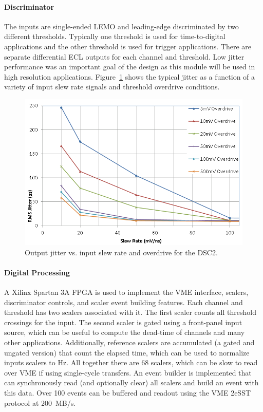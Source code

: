 \paragraph{Discriminator}
The inputs are single-ended LEMO and leading-edge discriminated by two different thresholds. Typically one threshold
is used for time-to-digital applications and the other threshold is used for trigger applications. There are separate
differential ECL outputs for each channel and threshold. Low jitter performance was an important goal of the design as
this module will be used in high resolution applications. Figure~\ref{fig:dsc2_jitter} shows the typical jitter as a function
of a variety of input slew rate signals and threshold overdrive conditions.

\begin{figure}[hbt]
	\centering
	\includegraphics[width=1.0\columnwidth,keepaspectratio]{img/dsc2_jitter.png}
	\caption{Output jitter vs. input slew rate and overdrive for the DSC2.}
	\label{fig:dsc2_jitter}
\end{figure}

\paragraph{Digital Processing}
A Xilinx Spartan 3A FPGA is used to implement the VME interface, scalers, discriminator controls, and scaler event
building features. Each channel and threshold has two scalers associated with it. The first scaler counts all threshold
crossings for the input. The second scaler is gated using a front-panel input source, which can be useful to compute
the dead-time of channels and many other applications. Additionally, reference scalers are accumulated (a gated and
ungated version) that count the elapsed time, which can be used to normalize inputs scalers to Hz. All together there
are 68 scalers, which can be slow to read over VME if using single-cycle transfers. An event builder is implemented that
can synchronously read (and optionally clear) all scalers and build an event with this data. Over 100 events can be
buffered and readout using the VME 2eSST protocol at 200~MB/s.

